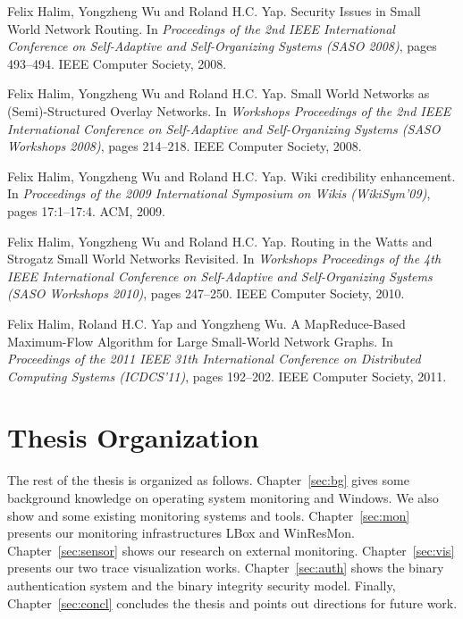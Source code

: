\begin{tightenumerate}
\item
Felix Halim, Yongzheng Wu and Roland H.C. Yap.
\newblock Security Issues in Small World Network Routing.
\newblock In {\em Proceedings of the 2nd IEEE International Conference on
  Self-Adaptive and Self-Organizing Systems (SASO 2008)},
  pages 493--494. IEEE Computer Society, 2008.

\item
Felix Halim, Yongzheng Wu and Roland H.C. Yap.
\newblock Small World Networks as (Semi)-Structured Overlay Networks.
\newblock In {\em Workshops Proceedings of the 2nd IEEE International
  Conference on Self-Adaptive and Self-Organizing Systems
  (SASO Workshops 2008)},
  pages 214--218. IEEE Computer Society, 2008.

\item
Felix Halim, Yongzheng Wu and Roland H.C. Yap.
\newblock Wiki credibility enhancement.
\newblock In {\em Proceedings of the 2009 International Symposium on Wikis (WikiSym'09)},
  pages 17:1--17:4. ACM, 2009.

\item
Felix Halim, Yongzheng Wu and Roland H.C. Yap.
\newblock Routing in the Watts and Strogatz Small World Networks Revisited.
\newblock In {\em Workshops Proceedings of the 4th IEEE International
  Conference on Self-Adaptive and Self-Organizing Systems
  (SASO Workshops 2010)},
  pages 247--250. IEEE Computer Society, 2010.

\item
Felix Halim, Roland H.C. Yap and Yongzheng Wu.
\newblock A MapReduce-Based Maximum-Flow Algorithm for Large Small-World
  Network Graphs.
\newblock In {\em Proceedings of the 2011 IEEE 31th International Conference on
  Distributed Computing Systems (ICDCS'11)},
  pages 192--202. IEEE Computer Society, 2011.
\end{tightenumerate}

\section{Thesis Organization}
\label{sec:outline}

The rest of the thesis is organized as follows.
Chapter~\ref{sec:bg} gives some background knowledge on operating
system monitoring and Windows.
We also show and some existing monitoring systems and tools.
Chapter~\ref{sec:mon} presents our monitoring infrastructures LBox
and WinResMon.
Chapter~\ref{sec:sensor} shows our research on external monitoring.
Chapter~\ref{sec:vis} presents our two trace visualization works.
Chapter~\ref{sec:auth} shows the binary authentication system and
the binary integrity security model.
Finally, Chapter~\ref{sec:concl} concludes the thesis and points out
directions for future work.
